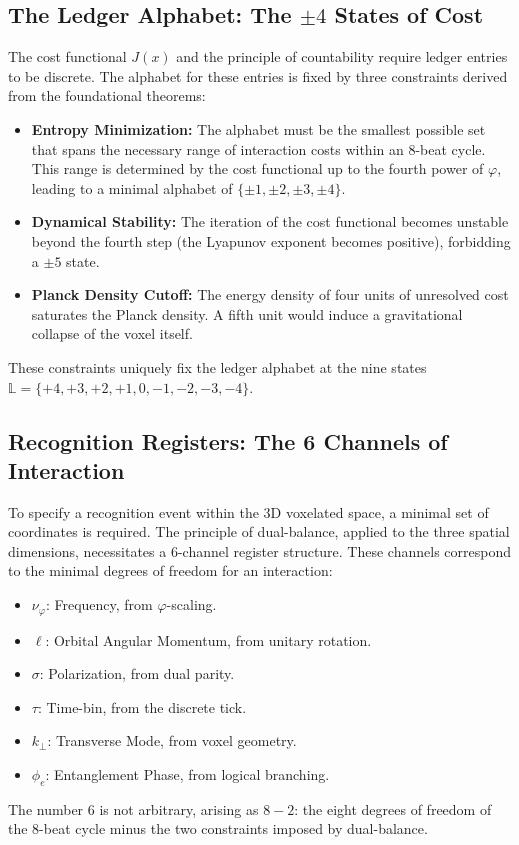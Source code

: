 \documentclass[11pt,a4paper]{article}
\begin{document}
\subsection{The Ledger Alphabet: The \(\pm4\) States of Cost}
The cost functional \(J(x)\) and the principle of countability require ledger entries to be discrete. The alphabet for these entries is fixed by three constraints derived from the foundational theorems:
\begin{itemize}
    \item \textbf{Entropy Minimization:} The alphabet must be the smallest possible set that spans the necessary range of interaction costs within an 8-beat cycle. This range is determined by the cost functional up to the fourth power of \(\varphi\), leading to a minimal alphabet of \(\{\pm1, \pm2, \pm3, \pm4\}\).
    \item \textbf{Dynamical Stability:} The iteration of the cost functional becomes unstable beyond the fourth step (the Lyapunov exponent becomes positive), forbidding a \(\pm5\) state.
    \item \textbf{Planck Density Cutoff:} The energy density of four units of unresolved cost saturates the Planck density. A fifth unit would induce a gravitational collapse of the voxel itself.
\end{itemize}
These constraints uniquely fix the ledger alphabet at the nine states \(\mathbb{L} = \{+4, +3, +2, +1, 0, -1, -2, -3, -4\}\).

\subsection{Recognition Registers: The 6 Channels of Interaction}
To specify a recognition event within the 3D voxelated space, a minimal set of coordinates is required. The principle of dual-balance, applied to the three spatial dimensions, necessitates a 6-channel register structure. These channels correspond to the minimal degrees of freedom for an interaction:
\begin{itemize}
    \item \(\nu_\varphi\): Frequency, from \(\varphi\)-scaling.
    \item \(\ell\): Orbital Angular Momentum, from unitary rotation.
    \item \(\sigma\): Polarization, from dual parity.
    \item \(\tau\): Time-bin, from the discrete tick.
    \item \(k_\perp\): Transverse Mode, from voxel geometry.
    \item \(\phi_e\): Entanglement Phase, from logical branching.
\end{itemize}
The number 6 is not arbitrary, arising as \(8-2\): the eight degrees of freedom of the 8-beat cycle minus the two constraints imposed by dual-balance.
\end{document}

